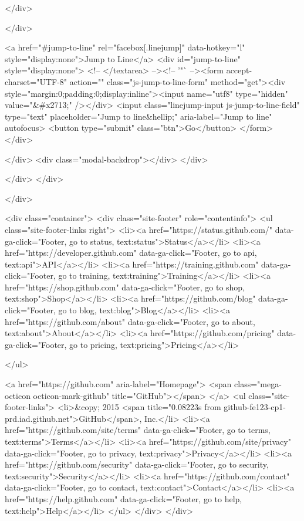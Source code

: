   </div>

</div>

<a href="#jump-to-line" rel="facebox[.linejump]" data-hotkey="l" style="display:none">Jump to Line</a>
<div id="jump-to-line" style="display:none">
  <!-- </textarea> --><!-- '"` --><form accept-charset="UTF-8" action="" class="js-jump-to-line-form" method="get"><div style="margin:0;padding:0;display:inline"><input name="utf8" type="hidden" value="&#x2713;" /></div>
    <input class="linejump-input js-jump-to-line-field" type="text" placeholder="Jump to line&hellip;" aria-label="Jump to line" autofocus>
    <button type="submit" class="btn">Go</button>
</form></div>

  </div>
  <div class="modal-backdrop"></div>
</div>

    </div>
  </div>

    </div>

        <div class="container">
  <div class="site-footer" role="contentinfo">
    <ul class="site-footer-links right">
        <li><a href="https://status.github.com/" data-ga-click="Footer, go to status, text:status">Status</a></li>
      <li><a href="https://developer.github.com" data-ga-click="Footer, go to api, text:api">API</a></li>
      <li><a href="https://training.github.com" data-ga-click="Footer, go to training, text:training">Training</a></li>
      <li><a href="https://shop.github.com" data-ga-click="Footer, go to shop, text:shop">Shop</a></li>
        <li><a href="https://github.com/blog" data-ga-click="Footer, go to blog, text:blog">Blog</a></li>
        <li><a href="https://github.com/about" data-ga-click="Footer, go to about, text:about">About</a></li>
        <li><a href="https://github.com/pricing" data-ga-click="Footer, go to pricing, text:pricing">Pricing</a></li>

    </ul>

    <a href="https://github.com" aria-label="Homepage">
      <span class="mega-octicon octicon-mark-github" title="GitHub"></span>
</a>
    <ul class="site-footer-links">
      <li>&copy; 2015 <span title="0.08223s from github-fe123-cp1-prd.iad.github.net">GitHub</span>, Inc.</li>
        <li><a href="https://github.com/site/terms" data-ga-click="Footer, go to terms, text:terms">Terms</a></li>
        <li><a href="https://github.com/site/privacy" data-ga-click="Footer, go to privacy, text:privacy">Privacy</a></li>
        <li><a href="https://github.com/security" data-ga-click="Footer, go to security, text:security">Security</a></li>
        <li><a href="https://github.com/contact" data-ga-click="Footer, go to contact, text:contact">Contact</a></li>
        <li><a href="https://help.github.com" data-ga-click="Footer, go to help, text:help">Help</a></li>
    </ul>
  </div>
</div>



